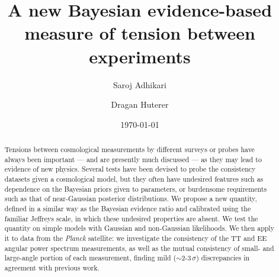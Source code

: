 \documentclass[amsmath, prl, reprint, aps]{revtex4-1}
\newcommand{\dragan}[1]{\textcolor{red}{(DH: #1)}}
\begin{document}
    \title{A new {Bayesian evidence-based} measure of tension between experiments} %
    \author{Saroj Adhikari} 
    \author{Dragan Huterer}     
    \date{\today}
    
    \begin{abstract}
        Tensions between cosmological measurements by different surveys or probes have always been important --- and are presently much discussed --- as they may lead to evidence of new physics.  Several tests have been devised to probe the consistency datasets given a cosmological model, but they often have undesired features such as dependence on the Bayesian priors given to parameters, or burdensome requirements such as that of near-Gaussian posterior distributions. We propose a new quantity, defined in a similar way as the Bayesian evidence ratio and calibrated using the familiar Jeffreys scale, in which these undesired properties are absent. We test the quantity on simple models with Gaussian and non-Gaussian likelihoods. We then apply it to data from the {\it Planck} satellite: we investigate the consistency of the TT and EE angular power spectrum measurements, as well as the mutual consistency of small- and large-angle portion of each measurement, finding mild ($\sim$2-$3\,\sigma$) discrepancies in agreement with previous work. 
    \end{abstract}
    
\end{document}

